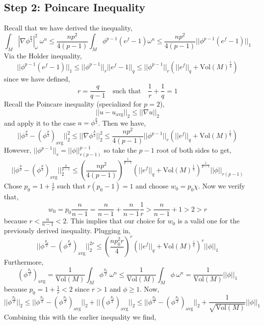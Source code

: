 \documentclass[12pt]{extarticle}
\theoremstyle{definition}
\newcommand{\Vol}[1]{\mathrm{Vol}\left(#1\right)}
\begin{document}
\subsection{Step 2: Poincare Inequality}

Recall that we have derived the inequality,
\[ \int_M | \nabla \phi^{\frac{p}{2}} |_\omega^2 \: \omega^n \le \frac{n p^2}{4(p-1)} \int_M \phi^{p - 1} (e^f - 1) \omega^n \le \frac{n p^2}{4(p-1)} || \phi^{p-1} (e^f - 1) ||_1 \]
Via the Holder inequality,
\[ || \phi^{p-1} (e^f - 1) ||_1 \le || \phi^{p - 1} ||_{r} || e^f - 1 ||_q \le || \phi^{p - 1} ||_r \left( || e^f ||_q + \Vol{M}^{\frac{1}{q}} \right) \]
since we have defined,
\[ r = \frac{q}{q - 1} \quad \text{such that} \quad \frac{1}{r} + \frac{1}{q} = 1 \]
Recall the Poincare inequality (specialized for $p = 2$),
\[ || u - u_{\text{avg}} ||_2 \le || \nabla u ||_2 \]
and apply it to the case $u = \phi^{\frac{p}{2}}$. Then we have,
\[ || \phi^{\frac{p}{2}} - (\phi^{\frac{p}{2}})_{\text{avg}} ||^2_2 \le || \nabla \phi^{\frac{p}{2}} ||^2_2 \le \frac{n p^2}{4(p-1)} || \phi^{p-1} ||_r \left( || e^f ||_q + \Vol{M}^{\frac{1}{q}} \right) \]
However, $|| \phi^{p - 1} ||_r = || \phi ||_{r (p - 1)}^{p - 1}$ so take the $p - 1$ root of both sides to get,
\[ || \phi^{\frac{p}{2}} - (\phi^{\frac{p}{2}})_{\text{avg}} ||^{\frac{2}{p - 1}}_2 \le \left( \frac{n p^2}{4(p-1)} \right)^{\frac{1}{p - 1}} \left( || e^f ||_q + \Vol{M}^{\frac{1}{q}} \right)^{\frac{1}{p-1}} || \phi ||_{r(p-1)}  \]
Chose $p_0 = 1 + \frac{1}{r}$ such that $r(p_0 - 1) =1$ and choose $w_0 = p_0 \chi$. Now we verify that,
\[ w_0 = p_0 \frac{n}{n-1} = \frac{n}{n-1} + \frac{n}{n-1} \frac{1}{r}  > \frac{n}{n-1} + 1 > 2 > r \]
because $r < \frac{n}{n-1} < 2$. This implies that our choice for $w_0$ is a valid one for the previously derived inequality. Plugging in,
\[ || \phi^{\frac{p_0}{2}} - (\phi^{\frac{p_0}{2}})_{\text{avg}} ||^{2r}_2 \le \left( \frac{n p_0^2 r}{4} \right)^{r} \left( || e^f ||_q + \Vol{M}^{\frac{1}{q}} \right)^{r} || \phi ||_{1}  \]
Furthermore,
\[ (\phi^{\frac{p_0}{2}})_{\text{avg}} = \frac{1}{\Vol{M}} \int_M \phi^{\frac{p_0}{2}} \: \omega^n \le \frac{1}{\Vol{M}} \int_M \phi \: \omega^n = \frac{1}{\Vol{M}} || \phi ||_{1} \]
because $p_0 = 1 + \frac{1}{r} < 2$ since $r > 1$ and $\phi \ge 1$. Now,
\[ || \phi^{\frac{p_0}{2}} ||_2 \le  || \phi^{\frac{p_0}{2}} - (\phi^{\frac{p_0}{2}})_{\text{avg}} ||_2 + || (\phi^{\frac{p_0}{2}})_{\text{avg}} ||_2 \le || \phi^{\frac{p_0}{2}} - (\phi^{\frac{p_0}{2}})_{\text{avg}} ||_2 + \frac{1}{\sqrt{\Vol{M}}} || \phi ||_1 \]
Combining this with the earlier inequality we find,
\end{document}
